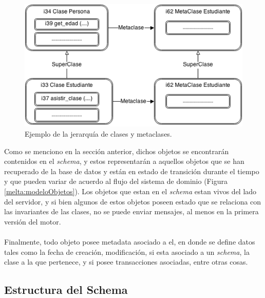 \documentclass{melta}
\begin{document}
\begin{figure}
\centering
\includegraphics[scale=0.5]{MeltaMetaclase}
\caption{Ejemplo de la jerarquía de clases y metaclases.}
\label{melta:Metaclase}
\end{figure}


Como se menciono en la sección anterior, dichos objetos se encontrarán contenidos en el \textit{schema}, y estos representarán a aquellos objetos que se han recuperado de la base de datos y están en estado de transición durante el tiempo y que pueden variar de acuerdo al flujo del sistema de dominio (Figura \ref{melta:modeloObjetos}). Los objetos que estan en el \textit{schema} estan vivos del lado del servidor, y si bien algunos de estos objetos poseen estado que se relaciona con las invariantes de las clases, no se puede enviar mensajes, al menos en la primera versión del motor.
\\\\
Finalmente, todo objeto posee metadata asociado a el, en donde se define datos tales como la fecha de creación, modificación, si esta asociado a un \textit{schema}, la clase a la que pertenece, y si posee transacciones asociadas, entre otras cosas.

\subsection*{Estructura del Schema}
\end{document}
